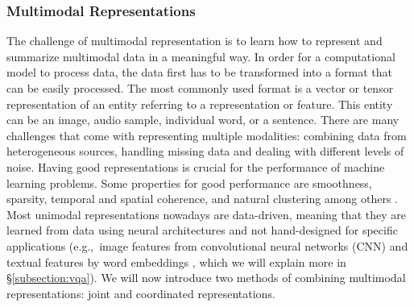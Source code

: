 \documentclass{article}
\begin{document}
\subsubsection{Multimodal Representations}

The challenge of multimodal representation is to learn how to represent and summarize multimodal data in a meaningful way. In order for a computational model to process data, the data first has to be transformed into a format that can be easily processed. The most commonly used format is a vector or tensor representation of an entity referring to a representation or feature. This entity can be an image, audio sample, individual word, or a sentence. There are many challenges that come with representing multiple modalities: combining data from heterogeneous sources, handling missing data and dealing with different levels of noise. Having good representations is crucial for the performance of machine learning problems. Some properties for good performance are smoothness, sparsity, temporal and spatial coherence, and natural clustering among others \citep{bengio2013represent}. Most unimodal representations nowadays are data-driven, meaning that they are learned from data using neural architectures and not hand-designed for specific applications (e.g.,\ image features from convolutional neural networks (CNN) \citep{krizhevsky2012imagenet} and textual features by word embeddings \citep{mikolov2013distri}, which we will explain more in \S \ref{subsection:vqa}). We will now introduce two methods of combining multimodal representations: joint and coordinated representations.
\end{document}
